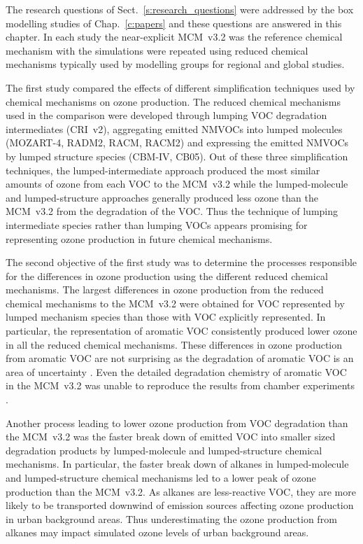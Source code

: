 The research questions of Sect.~\ref{s:research_questions} were addressed by the box modelling studies of Chap.~\ref{c:papers} and these questions are answered in this chapter.
In each study the near-explicit MCM~v3.2 was the reference chemical mechanism with the simulations were repeated using reduced chemical mechanisms typically used by modelling groups for regional and global studies.

The first study compared the effects of different simplification techniques used by chemical mechanisms on ozone production.
The reduced chemical mechanisms used in the comparison were developed through lumping VOC degradation intermediates (CRI~v2), aggregating emitted NMVOCs into lumped molecules (MOZART-4, RADM2, RACM, RACM2) and expressing the emitted NMVOCs by lumped structure species (CBM-IV, CB05).
Out of these three simplification techniques, the lumped-intermediate approach produced the most similar amounts of ozone from each VOC to the MCM~v3.2 while the lumped-molecule and lumped-structure approaches generally produced less ozone than the MCM~v3.2 from the degradation of the VOC.
Thus the technique of lumping intermediate species rather than lumping VOCs appears promising for representing ozone production in future chemical mechanisms.

The second objective of the first study was to determine the processes responsible for the differences in ozone production using the different reduced chemical mechanisms.
The largest differences in ozone production from the reduced chemical mechanisms to the MCM~v3.2 were obtained for VOC represented by lumped mechanism species than those with VOC explicitly represented.
In particular, the representation of aromatic VOC consistently produced lower ozone in all the reduced chemical mechanisms.
These differences in ozone production from aromatic VOC are not surprising as the degradation of aromatic VOC is an area of uncertainty \citep{Atkinson:2003}.
Even the detailed degradation chemistry of aromatic VOC in the MCM~v3.2 was unable to reproduce the results from chamber experiments \citep{Bloss:2005}.

Another process leading to lower ozone production from VOC degradation than the MCM~v3.2 was the faster break down of emitted VOC into smaller sized degradation products by lumped-molecule and lumped-structure chemical mechanisms.
In particular, the faster break down of alkanes in lumped-molecule and lumped-structure chemical mechanisms led to a lower peak of ozone production than the MCM~v3.2.
As alkanes are less-reactive VOC, they are more likely to be transported downwind of emission sources affecting ozone production in urban background areas.
Thus underestimating the ozone production from alkanes may impact simulated ozone levels of urban background areas.


